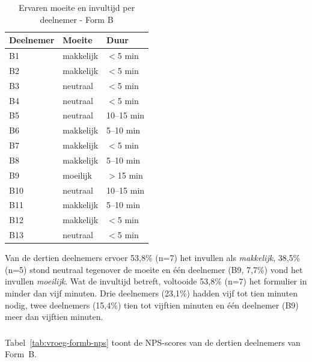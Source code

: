 \begin{table}[h]
  \centering
  \caption[Ervaren moeite en invultijd vroege test Form B]{Ervaren moeite en invultijd per deelnemer - Form B}
  \label{tab:vroeg-formb-moeite}
  \begin{tabular}{lll}
    \hline
    \textbf{Deelnemer} & \textbf{Moeite} & \textbf{Duur} \\
    \hline
    B1  & makkelijk  & $<$5 min    \\
    B2  & makkelijk  & $<$5 min    \\
    B3  & neutraal   & $<$5 min    \\
    B4  & neutraal   & $<$5 min    \\
    B5  & neutraal   & 10–15 min   \\
    B6  & makkelijk  & 5–10 min    \\
    B7  & makkelijk  & $<$5 min    \\
    B8  & makkelijk  & 5–10 min    \\
    B9  & moeilijk   & $>$15 min   \\
    B10 & neutraal   & 10–15 min   \\
    B11 & makkelijk  & 5–10 min    \\
    B12 & makkelijk  & $<$5 min    \\
    B13 & neutraal   & $<$5 min    \\
    \hline
  \end{tabular}
\end{table}

Van de dertien deelnemers ervoer 53,8\% (n=7) het invullen als \textit{makkelijk}, 38,5\% (n=5) stond neutraal tegenover de moeite en één deelnemer (B9, 7,7\%) vond het invullen \textit{moeilijk}. Wat de invultijd betreft, voltooide 53,8\% (n=7) het formulier in minder dan vijf minuten. Drie deelnemers (23,1\%) hadden vijf tot tien minuten nodig, twee deelnemers (15,4\%) tien tot vijftien minuten en één deelnemer (B9) meer dan vijftien minuten.

\subsubsection{}

Tabel~\ref{tab:vroeg-formb-nps} toont de NPS-scores van de dertien deelnemers van Form~B.

